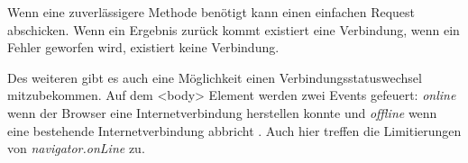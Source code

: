 Wenn eine zuverlässigere Methode benötigt kann einen einfachen Request abschicken. Wenn ein Ergebnis zurück kommt existiert eine Verbindung, wenn ein Fehler geworfen wird, existiert keine Verbindung. 

Des weiteren gibt es auch eine Möglichkeit einen Verbindungsstatuswechsel mitzubekommen. Auf dem <body> Element werden zwei Events gefeuert: \emph{online} wenn der Browser eine Internetverbindung herstellen konnte und \emph{offline} wenn eine bestehende Internetverbindung abbricht \autocite{mdn-online}. Auch hier treffen die Limitierungen von \emph{navigator.onLine} zu.

